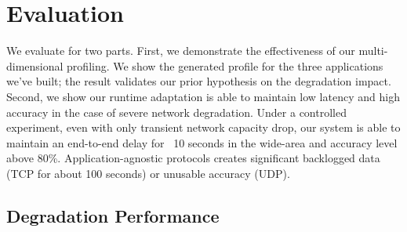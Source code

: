 \section{Evaluation}
\label{sec:evaluation}

We evaluate \sysname{} for two parts. First, we demonstrate the effectiveness of
our multi-dimensional profiling. We show the generated profile for the three
applications we've built; the result validates our prior hypothesis on the
degradation impact. Second, we show our runtime adaptation is able to maintain
low latency and high accuracy in the case of severe network degradation. Under a
controlled experiment, even with only transient network capacity drop, our
system is able to maintain an end-to-end delay for ~10 seconds in the wide-area
and accuracy level above 80\%. Application-agnostic protocols creates
significant backlogged data (TCP for about 100 seconds) or unusable accuracy
(UDP).

\subsection{Degradation Performance}
\label{sec:degr-perf}

